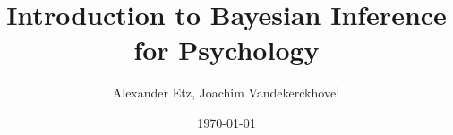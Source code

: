 \documentclass[doc]{apa6}
\title{Introduction to Bayesian Inference for Psychology}
\author{Alexander Etz, Joachim Vandekerckhove$^\dagger$}%
\affiliation{University of California, Irvine}%
\date{\today}
\renewcommand{\|}{\,|\,}
\begin{document}
\begin{figure}[t]
\begin{center}

\end{center}
\end{figure}
\end{document}
